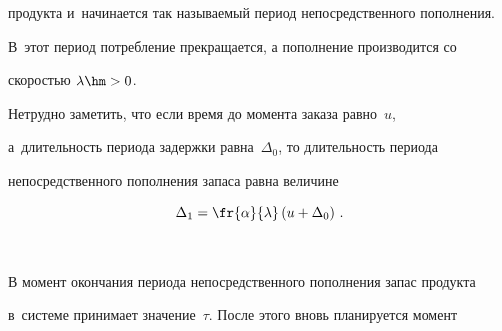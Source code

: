 продукта и~начинается так называемый период непосредственного пополнения. 

В~этот период потребление прекращается, а пополнение производится со 

скоростью $\lambda\hm>0$.

  

  Нетрудно заметить, что если время до момента заказа равно~$u$, 

а~длительность периода задержки равна~$\Delta_0$, то длительность периода 

непосредственного пополнения запаса равна величине 

$$

\Delta_1=  \fr{\alpha}{\lambda}\left(u+\Delta_0\right)\,.

$$



\pagebreak



\



\vspace*{-12pt}








  

  В момент окончания периода не\-посредственного пополнения запас продукта 

в~системе принимает значение~$\tau$. После этого вновь планируется момент


